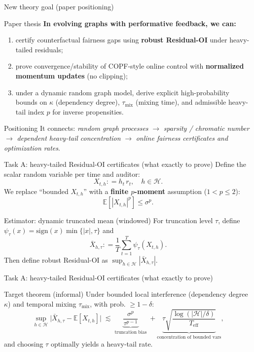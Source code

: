 \documentclass[aspectratio=169,11pt]{beamer}
\newcommand{\1}{\mathbbm{1}}
\newcommand{\E}{\mathbb{E}}
\newcommand{\cH}{\mathcal{H}}
\newcommand{\defeq}{\mathrel{\mathop:}=}
\begin{document}
\begin{frame}{New theory goal (paper positioning)}
\begin{block}{Paper thesis}
\small
\textbf{In evolving graphs with performative feedback, we can:}
\begin{enumerate}
  \item[(A)] certify counterfactual fairness gaps using \textbf{robust Residual-OI} under heavy-tailed residuals;
  \item[(B)] prove convergence/stability of COPF-style online control with \textbf{normalized momentum updates} (no clipping);
  \item[(C)] under a dynamic random graph model, derive explicit high-probability bounds on
  \(\kappa\) (dependency degree), \(\tau_{\mathrm{mix}}\) (mixing time), and admissible heavy-tail index \(p\) for inverse propensities.
\end{enumerate}
\end{block}

\vspace{0.5em}
\begin{block}{Positioning}
\small
It connects: \emph{random graph processes} \(\to\) \emph{sparsity / chromatic number} \(\to\)
\emph{dependent heavy-tail concentration} \(\to\) \emph{online fairness certificates and optimization rates}.
\end{block}
\end{frame}

\begin{frame}{Task A: heavy-tailed Residual-OI certificates (what exactly to prove)}
\small
Define the scalar random variable per time and auditor:
\[
X_{t,h} \defeq h_t\, r_t, \quad h\in\cH.
\]
We replace ``bounded $X_{t,h}$'' with a \textbf{finite $p$-moment} assumption ($1<p\le 2$):
\[
\E[|X_{t,h}|^p] \le \sigma^p.
\]

\begin{block}{Estimator: dynamic truncated mean (windowed)}
\small
For truncation level $\tau$, define $\psi_\tau(x)=\mathrm{sign}(x)\min\{|x|,\tau\}$ and
\[
\bar X_{h,\tau} \defeq \frac{1}{T}\sum_{t=1}^T \psi_\tau(X_{t,h}).
\]
Then define robust Residual-OI as $\sup_{h\in\cH}|\bar X_{h,\tau}|$.
\end{block}
\end{frame}

\begin{frame}{Task A: heavy-tailed Residual-OI certificates (what exactly to prove)}
\begin{block}{Target theorem (informal)}
\small
Under bounded local interference (dependency degree $\kappa$) and temporal mixing $\tau_{\mathrm{mix}}$,
with prob. $\ge 1-\delta$:
\[
\sup_{h\in\cH}\Big|\bar X_{h,\tau}-\E[X_{t,h}]\Big|
\;\lesssim\;
\underbrace{\frac{\sigma^p}{\tau^{p-1}}}_{\text{truncation bias}}
\;+
\underbrace{\tau\sqrt{\frac{\log(|\cH|/\delta)}{T_{\mathrm{eff}}}}}_{\text{concentration of bounded vars}},
\]
and choosing $\tau$ optimally yields a heavy-tail rate.
\end{block}
\end{frame}
\end{document}
